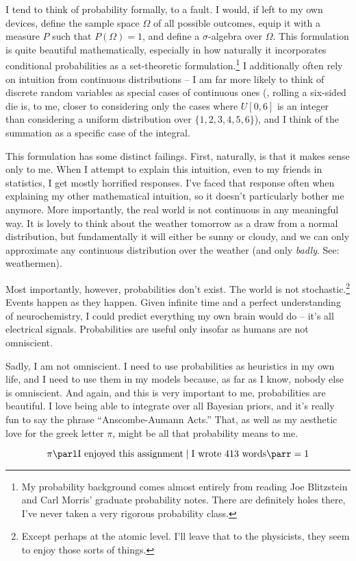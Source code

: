 \documentclass[12pt]{article}
\begin{document}
\maketitle

I tend to think of probability formally, to a fault. I would, if left to my own devices, define the sample space $\Omega$ of all possible outcomes, equip it with a measure $P$ such that $P(\Omega) = 1$, and define a $\sigma$-algebra over $\Omega$. This formulation is quite beautiful mathematically, especially in how naturally it incorporates conditional probabilities as a set-theoretic formulation.\footnote{My probability background comes almost entirely from reading Joe Blitzstein and Carl Morris' graduate probability notes. There are definitely holes there, I've never taken a very rigorous probability class.} I additionally often rely on intuition from continuous distributions -- I am far more likely to think of discrete random variables as special cases of continuous ones (\eg, rolling a six-sided die is, to me, closer to considering only the cases where $U[0,6]$ is an integer than considering a uniform distribution over $\{1,2,3,4,5,6\}$), and I think of the summation as a specific case of the integral. 

This formulation has some distinct failings. First, naturally, is that it makes sense only to me. When I attempt to explain this intuition, even to my friends in statistics, I get mostly horrified responses. I've faced that response often when explaining my other mathematical intuition, so it doesn't particularly bother me anymore. More importantly, the real world is not continuous in any meaningful way. It is lovely to think about the weather tomorrow as a draw from a normal distribution, but fundamentally it will either be sunny or cloudy, and we can only approximate any continuous distribution over the weather (and only \emph{badly}. See: weathermen). 

Most importantly, however, probabilities don't exist. The world is not stochastic.\footnote{Except perhaps at the atomic level. I'll leave that to the physicists, they seem to enjoy those sorts of things.} Events happen as they happen. Given infinite time and a perfect understanding of neurochemistry, I could predict everything my own brain would do -- it's all electrical signals. Probabilities are useful only insofar as humans are not omniscient.

Sadly, I am not omniscient. I need to use probabilities as heuristics in my own life, and I need to use them in my models because, as far as I know, nobody else is omniscient. And again, and this is very important to me, probabilities are beautiful. I love being able to integrate over all Bayesian priors, and it's really fun to say the phrase ``Anscombe-Aumann Acts.'' That, as well as my aesthetic love for the greek letter $\pi$, might be all that probability means to me.

\[
\pi\parl \text{I enjoyed this assignment} \mid \text{I wrote 413 words}\parr = 1
\]
\end{document}
